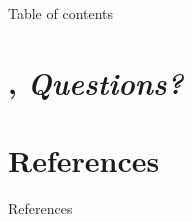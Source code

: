\documentclass{beamer}
\title{\tlap}
\subtitle{%
    A modeling language for
    \texorpdfstring{\linebreak}{}%
    concurrent and distributed systems
}
\author{M. Donadoni \and A. Fulgini \and E. Morassutto}
\newif\ifhidesechead
\begin{document}
    \begin{frame}
        \maketitle
    \end{frame}

    \begin{frame}{Table of contents}
      \tableofcontents[hideallsubsections]
    \end{frame}

    

    

    

    

    \hidesecheadtrue

    

    \section*{\texorpdfstring{\Circle}{Next}, \emph{Questions?}}
    \begin{frame}
        \sectionpage
    \end{frame}

    \nocite{*}
    \section*{References}
    \begin{frame}{References}
        \scriptsize
        
        
    \end{frame}
\end{document}
